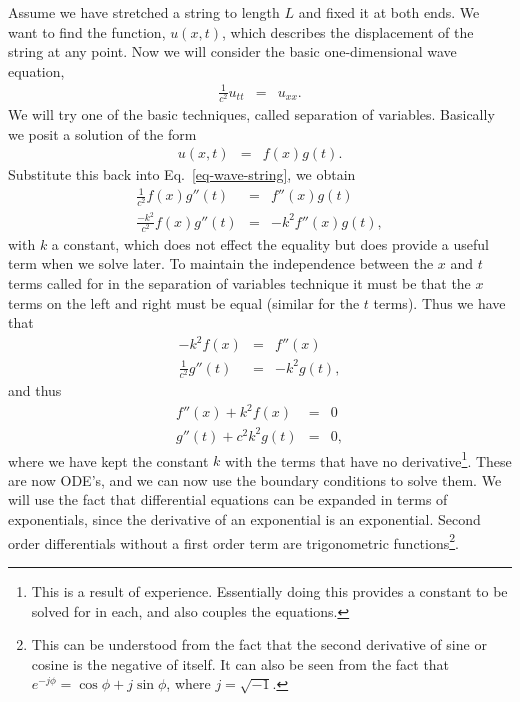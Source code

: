 Assume we have stretched a string to length $L$ and fixed it at both ends.  We want to find the function, $u(x,t)$, which describes the displacement of the string at any point.  Now we will consider the basic one-dimensional wave equation,
\begin{eqnarray}
\frac{1}{c^2}u_{tt} &=& u_{xx}. \label{eq-wave-string}
\end{eqnarray}
We will try one of the basic techniques, called separation of variables.  Basically we posit a solution of the form
\begin{eqnarray}
u(x,t) &=& f(x)g(t).
\end{eqnarray}
Substitute this back into Eq.~\ref{eq-wave-string}, we obtain
\begin{eqnarray}
\frac{1}{c^2}f(x)g''(t) &=& f''(x)g(t) \\
\frac{-k^2}{c^2}f(x)g''(t) &=& -k^2f''(x)g(t),
\end{eqnarray}
with $k$ a constant, which does not effect the equality but does provide a useful term when we solve later.  To maintain the independence between the $x$ and $t$ terms called for in the separation of variables technique it must be that the $x$ terms on the left and right must be equal (similar for the $t$ terms).  Thus we have that
\begin{eqnarray}
-k^2f(x) &=& f''(x) \\
\frac{1}{c^2}g''(t) &=& -k^2g(t),
\end{eqnarray}
and thus
\begin{eqnarray}
f''(x)+k^2f(x) &=& 0 \label{eq-wave-fx}\\
g''(t) +c^2k^2g(t) &=& 0 \label{eq-wave-gt},
\end{eqnarray}
where we have kept the constant $k$ with the terms that have no derivative\footnote{This is a result of experience.  Essentially doing this provides a constant to be solved for in each, and also couples the equations.}.  These are now ODE's, and we can now use the boundary conditions to solve them.  We will use the fact that differential equations can be expanded in terms of exponentials, since the derivative of an exponential is an exponential.  Second order differentials without a first order term are trigonometric functions\footnote{This can be understood from the fact that the second derivative of sine or cosine is the negative of itself.  It can also be seen from the fact that $e^{-j\phi}=\cos\phi+j\sin\phi$, where $j=\sqrt{-1}$.}.

